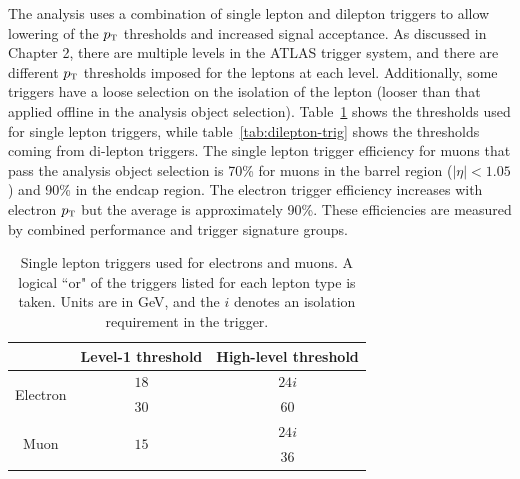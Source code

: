 The analysis uses a combination of single lepton and dilepton triggers to allow lowering of the $p_{\textrm{\footnotesize\sc t}}$ thresholds and increased signal acceptance. As discussed in Chapter 2, there are multiple levels in the ATLAS trigger system, and there are different $p_{\textrm{\footnotesize\sc t}}$ thresholds imposed for the leptons at each level. Additionally, some triggers have a loose selection on the isolation of the lepton (looser than that applied offline in the analysis object selection). Table~\ref{tab:single-lepton-trig} shows the thresholds used for single lepton triggers, while table~\ref{tab:dilepton-trig} shows the thresholds coming from di-lepton triggers. The single lepton trigger efficiency for muons that pass the analysis object selection is 70\% for muons in the barrel region ($|\eta| < 1.05$) and 90\% in the endcap region. The electron trigger efficiency increases with electron $p_{\textrm{\footnotesize\sc t}}$ but the average is approximately 90\%. These efficiencies are measured by combined performance and trigger signature groups\cite{MuonTrigger2012,ElectronTrigger2012}.



\begin{table}[h!]
\centering
\captionsetup{justification=centering}

\hspace{-10pt}
\begin{tabular}{|c|c|c|}
\hline
 & Level-1 threshold & High-level threshold \\ \hline \hline
\multirow{2}{*}{Electron} & $18$ & $24i$ \\ 
 & $30$ & $60$ \\ \hline

\multirow{2}{*}{Muon} & \multirow{2}{*}{$15$} & $24i$ \\ 
& & $36$ \\ 
 \hline

\end{tabular}

\caption{
Single lepton triggers used for electrons and muons. A logical ``or" of the triggers listed for each lepton type is taken. Units are in GeV, and the $i$ denotes an isolation requirement in the trigger. 
}
\label{tab:single-lepton-trig}
\end{table}

